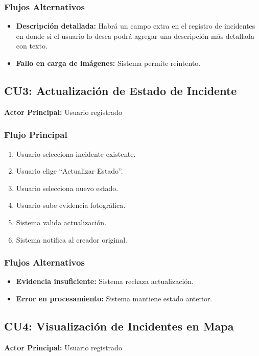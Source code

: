 \subsubsection*{Flujos Alternativos}
\begin{itemize}
    \item \textbf{Descripción detallada:} Habrá un campo extra en el registro de incidentes en donde si el usuario lo desea podrá agregar una descripción más detallada con texto. 
    \item \textbf{Fallo en carga de imágenes:} Sistema permite reintento.
\end{itemize}

\subsection{CU3: Actualización de Estado de Incidente}
\textbf{Actor Principal:} Usuario registrado

\subsubsection*{Flujo Principal}
\begin{enumerate}
    \item Usuario selecciona incidente existente.
    \item Usuario elige ``Actualizar Estado''.
    \item Usuario selecciona nuevo estado.
    \item Usuario sube evidencia fotográfica.
    \item Sistema valida actualización.
    \item Sistema notifica al creador original.
\end{enumerate}

\subsubsection*{Flujos Alternativos}
\begin{itemize}
    \item \textbf{Evidencia insuficiente:} Sistema rechaza actualización.
    \item \textbf{Error en procesamiento:} Sistema mantiene estado anterior.
\end{itemize}

\subsection{CU4: Visualización de Incidentes en Mapa}
\textbf{Actor Principal:} Usuario registrado


